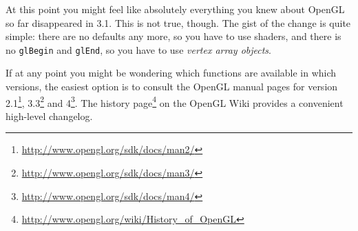 \documentclass{article}
\begin{document}
At this point you might feel like absolutely everything you knew about OpenGL so far disappeared in 3.1. This is not true, though. The gist of the change is quite simple: there are no defaults any more, so you have to use shaders, and there is no \texttt{glBegin} and \texttt{glEnd}, so you have to use \emph{vertex array objects}.

If at any point you might be wondering which functions are available in which versions, the easiest option is to consult the OpenGL manual pages for version 2.1\footnote{\url{http://www.opengl.org/sdk/docs/man2/}}, 3.3\footnote{\url{http://www.opengl.org/sdk/docs/man3/}} and 4\footnote{\url{http://www.opengl.org/sdk/docs/man4/}}. The history page\footnote{\url{http://www.opengl.org/wiki/History_of_OpenGL}} on the OpenGL Wiki provides a convenient high-level changelog.
\end{document}
